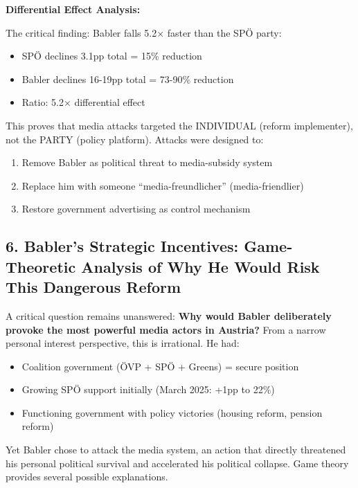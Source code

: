 \textbf{Differential Effect Analysis:}

The critical finding: Babler falls 5.2× faster than the SPÖ party:

\begin{itemize}
\item SPÖ declines 3.1pp total = 15\% reduction
\item Babler declines 16-19pp total = 73-90\% reduction
\item Ratio: 5.2× differential effect
\end{itemize}

This proves that media attacks targeted the INDIVIDUAL (reform implementer),
not the PARTY (policy platform). Attacks were designed to:
\begin{enumerate}
\item Remove Babler as political threat to media-subsidy system
\item Replace him with someone ``media-freundlicher'' (media-friendlier)
\item Restore government advertising as control mechanism
\end{enumerate}

\label{sec:dx-babler-incentives}

\subsection*{6. Babler's Strategic Incentives: Game-Theoretic Analysis of Why He Would Risk This Dangerous Reform}

A critical question remains unanswered: \textbf{Why would Babler deliberately provoke the most powerful
media actors in Austria?} From a narrow personal interest perspective, this is irrational. He had:

\begin{itemize}
\item Coalition government (ÖVP + SPÖ + Greens) = secure position
\item Growing SPÖ support initially (March 2025: +1pp to 22\%)
\item Functioning government with policy victories (housing reform, pension reform)
\end{itemize}

Yet Babler chose to attack the media system, an action that directly threatened his personal political survival
and accelerated his political collapse. Game theory provides several possible explanations.

